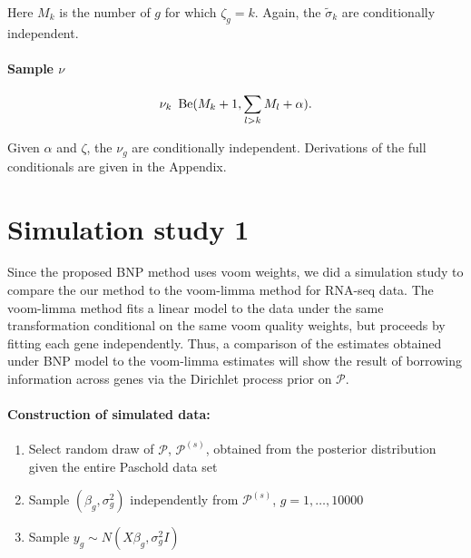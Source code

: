     Here $M_k$ is the number of $g$ for which $\zeta_g = k$. Again, the $\tilde{\sigma}_k$ are conditionally independent.

\paragraph{Sample $\nu$}
\begin{equation*}
\nu_k ~ \operatorname{Be}(M_k + 1, \sum_{l>k}M_l + \alpha).
\end{equation*}

Given $\alpha$ and $\zeta$, the $\nu_g$ are conditionally independent. Derivations of the full conditionals are given in the Appendix.

\section{Simulation study 1}
Since the proposed BNP method uses voom weights, we did a simulation study to compare the our method to the voom-limma method for RNA-seq data. The voom-limma method fits a linear model to the data under the same transformation conditional on the same voom quality weights, but proceeds by fitting each gene independently. Thus, a comparison of the estimates obtained under BNP model to the voom-limma estimates will show the result of borrowing information across genes via the Dirichlet process prior on $\mathcal{P}$.

\paragraph{Construction of simulated data:}
\begin{enumerate}
\item Select random draw of $\mathcal{P}$, $\mathcal{P}^{(s)}$, obtained from the posterior distribution given the entire Paschold data set

\item Sample $(\beta_g,\sigma^2_g)$ independently from $\mathcal{P}^{(s)}$, $g=1,\ldots,10000$

\item Sample $y_{g} \sim N(X\beta_g,\sigma^2_g I)$
\end{enumerate}

